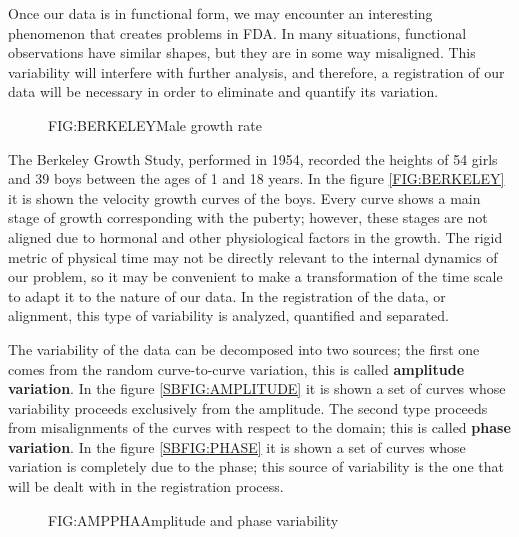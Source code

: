 Once our data is in functional form, we may encounter an interesting phenomenon
that creates problems in FDA. In many situations, functional observations have
similar shapes, but they are in some way misaligned. This variability will
interfere with further analysis, and therefore, a registration of our data will
be necessary in order to eliminate and quantify its variation.

\begin{figure}[Male growth rate]{FIG:BERKELEY}{Male growth rate}
\end{figure}

The Berkeley Growth Study\cite{berkeley}, performed in 1954, recorded the heights of 54
girls and 39 boys between the ages of 1 and 18 years. In the figure
\ref{FIG:BERKELEY} it is shown the velocity growth curves of the boys. Every curve shows a main stage of growth corresponding with the puberty;
however, these stages are not aligned due to hormonal and other
physiological factors in the growth. The rigid metric of physical time may not
be directly relevant to the internal dynamics of our problem, so it may be
convenient to make a transformation of the time scale to adapt it to the nature
of our data. In the registration of the data, or alignment, this type of
variability is analyzed, quantified and separated.



The variability of the data can be decomposed into two sources; the first one
comes from the random curve-to-curve variation\cite{Kokoszka2017}, this is called
\textbf{amplitude variation}. In the figure \ref{SBFIG:AMPLITUDE} it is shown a
set of curves whose variability proceeds exclusively from the amplitude. The
second type proceeds from misalignments of the curves with respect to the
domain; this is called \textbf{phase variation}. In the figure
\ref{SBFIG:PHASE} it is shown a set of curves whose variation is completely due
to the phase; this source of variability is the one that will be dealt with in
the registration process.

\begin{figure}[Amplitude and phase variability]{FIG:AMPPHA}{Amplitude and phase variability}
   \quad
\end{figure}
